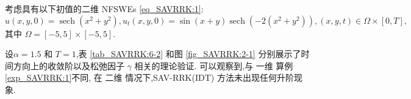 	\begin{example}\label{exp_SAVRRK:2}
		考虑具有以下初值的二维 NFSWEs \eqref{eq_SAVRRK:1}:
		\begin{equation*}
		u(x, y, 0)=\operatorname{sech}\left(x^2+y^2\right), u_t(x, y, 0)=\sin (x+y) \operatorname{sech}\left(-2\left(x^2+y^2\right)\right),(x, y, t) \in \Omega \times[0, T],
		\end{equation*}
		其中 $\Omega=[-5,5] \times[-5,5]$.
		\end{example}
			
		设$\alpha=1.5$ 和 $T=1$,表 \ref{tab_SAVRRK:6-2} 和图 \ref{fig_SAVRRK:2-1} 分别展示了时间方向上的收敛阶以及松弛因子 $\gamma$ 相关的理论验证.
		可以观察到,与 一维 算例\ref{exp_SAVRRK:1}不同, 在 二维 情况下,SAV-RRK(IDT) 方法未出现任何升阶现象.

